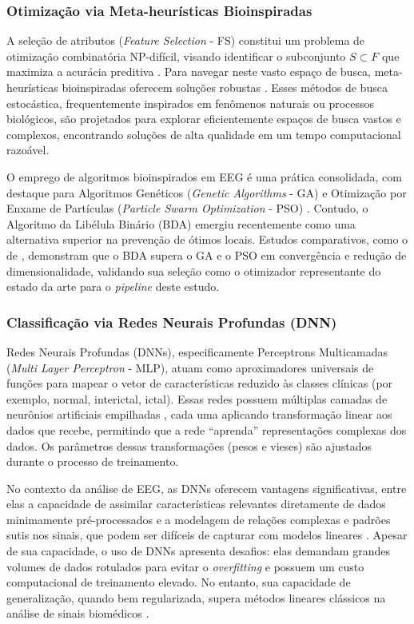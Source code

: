 \documentclass[alpha-refs,brazilian]{CC-EC_TF-TC}
\begin{document}
\subsubsection{Otimização via Meta-heurísticas Bioinspiradas}

A seleção de atributos (\textit{Feature Selection} - FS) constitui um problema de otimização combinatória NP-difícil, visando identificar o subconjunto $S \subset F$ que maximiza a acurácia preditiva \citep{Molina2002}. Para navegar neste vasto espaço de busca, meta-heurísticas bioinspiradas oferecem soluções robustas \citep{Becerra-Rozas2023}. Esses métodos de busca estocástica, frequentemente inspirados em fenômenos naturais ou processos biológicos, são projetados para explorar eficientemente espaços de busca vastos e complexos, encontrando soluções de alta qualidade em um tempo computacional razoável. 

O emprego de algoritmos bioinspirados em EEG é uma prática consolidada, com destaque para Algoritmos Genéticos (\textit{Genetic Algorithms} - GA) \citep{Subasi2007} e Otimização por Enxame de Partículas (\textit{Particle Swarm Optimization} - PSO) \citep{kennedy1995pso, Adam2014, Wang2022}. Contudo, o Algoritmo da Libélula Binário (BDA) \citep{Mirjalili2016, Emary2016} emergiu recentemente como uma alternativa superior na prevenção de ótimos locais. Estudos comparativos, como o de \cite{Mafarja2017}, demonstram que o BDA supera o GA e o PSO em convergência e redução de dimensionalidade, validando sua seleção como o otimizador representante do estado da arte para o \textit{pipeline} deste estudo.

\subsubsection{Classificação via Redes Neurais Profundas (DNN)}

Redes Neurais Profundas (DNNs), especificamente Perceptrons Multicamadas (\textit{Multi Layer Perceptron} - MLP), atuam como aproximadores universais de funções para mapear o vetor de características reduzido às classes clínicas (por exemplo, normal, interictal, ictal). Essas redes possuem múltiplas camadas de neurônios artificiais empilhadas \citep{Goodfellow2016}, cada uma aplicando transformação linear aos dados que recebe, permitindo que a rede ``aprenda'' representações complexas dos dados. Os parâmetros dessas transformações (pesos e vieses) são ajustados durante o processo de treinamento.

No contexto da análise de EEG, as DNNs oferecem vantagens significativas, entre elas a capacidade de assimilar características relevantes diretamente de dados minimamente pré-processados \citep{Roy2019Deep} e a modelagem de relações complexas e padrões sutis nos sinais, que podem ser difíceis de capturar com modelos lineares \citep{Lu2019Residual}. Apesar de sua capacidade, o uso de DNNs apresenta desafios: elas demandam grandes volumes de dados rotulados para evitar o \textit{overfitting} e possuem um custo computacional de treinamento elevado. No entanto, sua capacidade de generalização, quando bem regularizada, supera métodos lineares clássicos na análise de sinais biomédicos \citep{Roy2019Deep}.
\end{document}
